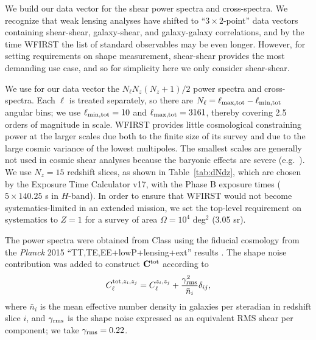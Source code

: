 \documentclass[aps,prd, amsmath,amssymb,superscriptaddress,showkeys,nofootinbib,reprint,preprintnumbers]{revtex4-1}
\begin{document}
We build our data vector for the shear power spectra and cross-spectra. We recognize that weak lensing analyses have shifted to ``$3\times 2$-point'' data vectors containing shear-shear, galaxy-shear, and galaxy-galaxy correlations, and by the time WFIRST the list of standard observables may be even longer. However, for setting requirements on shape measurement, shear-shear provides the most demanding use case, and so for simplicity here we only consider shear-shear.

We use for our data vector the $N_\ell N_z(N_z+1)/2$ power spectra and
cross-spectra. Each $\ell$ is treated separately, so there are
$N_\ell=\ell_{\rm max,tot}-\ell_{\rm min,tot}$ angular bins; we use
$\ell_{\rm min,tot}=10$ and $\ell_{\rm max,tot}=3161$, thereby
covering 2.5 orders of magnitude in scale. WFIRST provides little
cosmological constraining power at the larger scales due both to the
finite size of its survey and due to the large cosmic variance of the
lowest multipoles. The smallest scales are generally not used in
cosmic shear analyses because the baryonic effects are severe (e.g.\
\cite{2008PhRvD..77d3507Z, 2013PhRvD..87d3509Z}). We use $N_z=15$
redshift slices, as shown in Table~\ref{tab:dNdz}, which are chosen by the Exposure Time Calculator \cite{2012arXiv1204.5151H} v17, with the Phase B exposure times ($5\times 140.25$ s in $H$-band). In order to ensure
that WFIRST would not become systematics-limited in an extended
mission, we set the top-level requirement on systematics to $Z=1$ for
a survey of area $\Omega =10^4$ deg$^2$ (3.05 sr).

The power spectra were obtained from {\sc Class}
\cite{2011JCAP...07..034B} using the fiducial cosmology from the
{\slshape Planck} 2015 ``TT,TE,EE+lowP+lensing+ext'' results
\citep{2016A&A...594A..13P}. The shape noise contribution was added to
construct ${\bf C}^{\rm tot}$ according to
\begin{equation}
C^{{\rm tot},z_i,z_j}_\ell = C^{z_i,z_j}_\ell + \frac{\gamma_{\rm rms}^2}{\bar n_i}\delta_{ij},
\end{equation}
where $\bar n_i$ is the mean effective number density in galaxies per
steradian in redshift slice $i$, and $\gamma_{\rm rms}$ is the shape
noise expressed as an equivalent RMS shear per component; we take
$\gamma_{\rm rms} = 0.22$.
\end{document}
